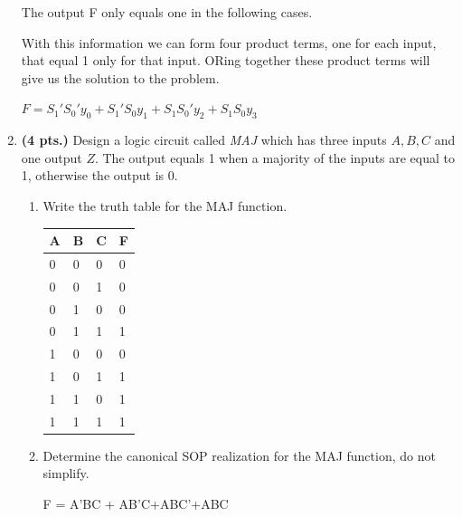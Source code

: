 \begin{enumerate}
\begin{solution}{
The output F only equals one in the following cases.

With this information we can form four product terms, one for each input, 
that equal 1 only for that input.  ORing together these product terms 
will give us the solution to the problem.

$F = S_1'S_0'y_0 + S_1'S_0 y_1 + S_1 S_0'y_2 + S_1 S_0 y_3$
} \end{solution}

\item  {\bf (4 pts.)} Design a logic circuit called {\it MAJ} which 
has three inputs $A,B,C$ and one output $Z$. The output equals 1 
when a majority of the inputs are equal to 1, otherwise the output is 0.
\begin{enumerate}
	\item Write the truth table for the MAJ function.

\begin{solution}{
	\begin{tabular}{l|l|l||l} \\ 
	A & B & C &  F \\ \hline
	0 & 0 & 0 &  0 \\ \hline
	0 & 0 & 1 &  0 \\ \hline
	0 & 1 & 0 &  0 \\ \hline
	0 & 1 & 1 &  1 \\ \hline
	1 & 0 & 0 &  0 \\ \hline
	1 & 0 & 1 &  1 \\ \hline
	1 & 1 & 0 &  1 \\ \hline
	1 & 1 & 1 &  1 \\ 
	\end{tabular}
}\end{solution}
	\item Determine the canonical SOP realization for the MAJ
	function, do not simplify.

\begin{solution}{ F = A'BC + AB'C+ABC'+ABC} \end{solution}
\end{enumerate}


\end{enumerate}
